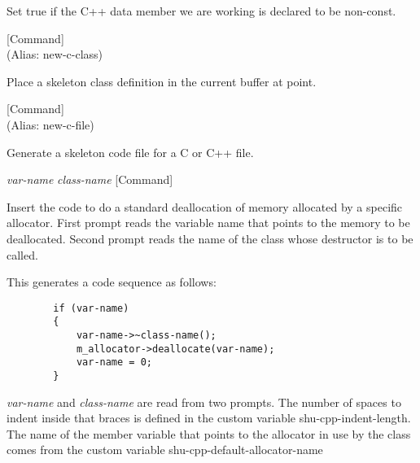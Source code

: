 \begin{doc-string}
Set true if the C++ data member we are working is declared to be non-const.
\end{doc-string}

\vspace{1em}
\noindent
{}
\usebox{\funcname}
 \hfill [Command]\\%
 (Alias: new-c-class)

\begin{doc-string}
Place a skeleton class definition in the current buffer at point.
\end{doc-string}

\vspace{1em}
\noindent
{}
\usebox{\funcname}
 \hfill [Command]\\%
 (Alias: new-c-file)

\begin{doc-string}
Generate a skeleton code file for a C or C++ file.
\end{doc-string}

\vspace{1em}
\noindent
{}
\usebox{\funcname}\emph{var-name} \emph{class-name}
 \hfill [Command]

\begin{doc-string}
Insert the code to do a standard deallocation of memory allocated by a
specific allocator.  First prompt reads the variable name that points to the
memory to be deallocated.  Second prompt reads the name of the class whose
destructor is to be called.

This generates a code sequence as follows:

\small{\begin{verbatim}
        if (var-name)
        {
            var-name->~class-name();
            m_allocator->deallocate(var-name);
            var-name = 0;
        }
\end{verbatim}}

\emph{var-name} and \emph{class-name} are read from two prompts.  The number of spaces to
indent inside that braces is defined in the custom variable
shu-cpp-indent-length.  The name of the member variable that points to the
allocator in use by the class comes from the custom variable
shu-cpp-default-allocator-name
\end{doc-string}

